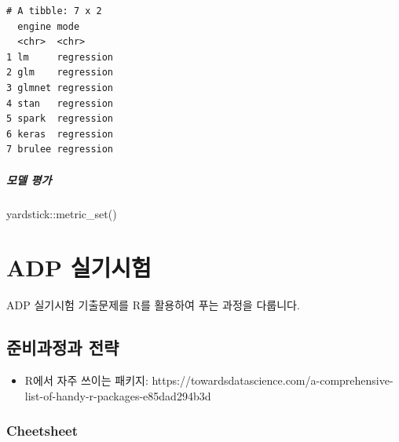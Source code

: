 \documentclass[
  letterpaper,
  DIV=11,
  numbers=noendperiod]{scrreprt}
\newenvironment{Shaded}{\begin{snugshade}}{\end{snugshade}}
\newcommand{\FunctionTok}[1]{\textcolor[rgb]{0.28,0.35,0.67}{#1}}
\newcommand{\NormalTok}[1]{\textcolor[rgb]{0.00,0.23,0.31}{#1}}
\newcommand{\SpecialCharTok}[1]{\textcolor[rgb]{0.37,0.37,0.37}{#1}}
\providecommand{\tightlist}{%
  \setlength{\itemsep}{0pt}\setlength{\parskip}{0pt}}\usepackage{longtable,booktabs,array}
\begin{document}
\begin{verbatim}
# A tibble: 7 x 2
  engine mode      
  <chr>  <chr>     
1 lm     regression
2 glm    regression
3 glmnet regression
4 stan   regression
5 spark  regression
6 keras  regression
7 brulee regression
\end{verbatim}

\hypertarget{uxbaa8uxb378-uxd3c9uxac00}{%
\subsubsection*{모델 평가}\label{uxbaa8uxb378-uxd3c9uxac00}}

\begin{Shaded}
\begin{Highlighting}[]
\NormalTok{yardstick}\SpecialCharTok{::}\FunctionTok{metric\_set}\NormalTok{()}
\end{Highlighting}
\end{Shaded}

\part{ADP 실기시험}

ADP 실기시험 기출문제를 R를 활용하여 푸는 과정을 다룹니다.

\hypertarget{uxc900uxbe44uxacfcuxc815uxacfc-uxc804uxb7b5-1}{%
\chapter{준비과정과
전략}\label{uxc900uxbe44uxacfcuxc815uxacfc-uxc804uxb7b5-1}}

\begin{itemize}
\tightlist
\item
  R에서 자주 쓰이는 패키지:
  https://towardsdatascience.com/a-comprehensive-list-of-handy-r-packages-e85dad294b3d
\end{itemize}

\hypertarget{cheetsheet}{%
\section{Cheetsheet}\label{cheetsheet}}
\end{document}
